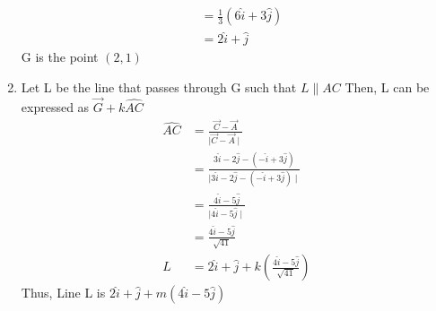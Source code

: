 \documentclass[12pt, a4paper,twocolumn]{article}
\begin{document}
\begin{enumerate}
\begin{align*}
        \\
        &=\frac{1}{3}(6\hat{i} + 3\hat{j})
        \\
        &= 2\hat{i} + \hat{j}
    \end{align*}
    G is the point $(2,1)$
\item Let L be the line that passes through G such that $L \parallel AC$
    Then, L can be expressed as $\vec{G} + k\hat{AC}$
    \begin{align*}
        \hat{AC} &= \frac{\vec{C} - \vec{A}}{\mid \vec{C} - \vec{A} \mid}
		\\        
        &= \frac{3\hat{i} - 2\hat{j} - (-\hat{i} + 3\hat{j})}{\mid 3\hat{i} - 2\hat{j} - (-\hat{i} + 3\hat{j}) \mid}
        \\
        &= \frac{4\hat{i} - 5\hat{j}}{\mid 4\hat{i} - 5\hat{j} \mid}
		\\        
        &= \frac{4\hat{i} - 5\hat{j}}{\sqrt{41}}
        \\
        L &= 2\hat{i} + \hat{j} + k(\frac{4\hat{i} - 5\hat{j}}{\sqrt{41}})
    \end{align*}
    Thus, Line L is $2\hat{i} + \hat{j} + m(4\hat{i} - 5\hat{j})$
\end{enumerate}
\end{document}
